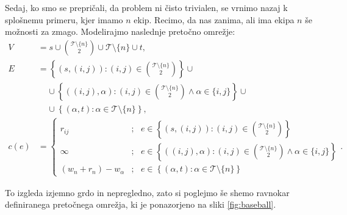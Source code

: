 \documentclass[mat1]{fmfdelo}
\begin{document}
Sedaj, ko smo se prepričali, da problem ni čisto trivialen, se vrnimo nazaj k splošnemu primeru, kjer imamo $n$ ekip. Recimo, da nas zanima, ali ima ekipa $n$ še možnosti za zmago. Modelirajmo naslednje pretočno omrežje:
\begin{align*}
V &= s \cup \binom{\mathcal{T} \setminus \{n\}}{2} \cup \mathcal{T} \setminus \{n\} \cup t,\\
E &= \left\{(s,(i,j)) : (i,j) \in \binom{\mathcal{T} \setminus \{n\}}{2}\right\} \cup\\
&~~~~~\cup \left\{((i,j), \alpha) : (i,j) \in \binom{\mathcal{T} \setminus \{n\}}{2} \wedge \alpha \in \{i,j\}\right\} \cup\\
&~~~~~\cup \left\{(\alpha, t) : \alpha \in \mathcal{T} \setminus \{n\}\right\},\\
c(e) &=\begin{cases}
r_{ij} &;~~~ e \in \left\{(s,(i,j)) : (i,j) \in \binom{\mathcal{T} \setminus \{n\}}{2}\right\}\\
\infty &;~~~ e \in \left\{((i,j), \alpha) : (i,j) \in \binom{\mathcal{T} \setminus \{n\}}{2} \wedge \alpha \in \{i,j\}\right\}\\
(w_n + r_n) - w_{\alpha} &;~~~ e \in \left\{(\alpha, t) : \alpha \in \mathcal{T} \setminus \{n\}\right\}
\end{cases}.
\end{align*}

To izgleda izjemno grdo in nepregledno, zato si poglejmo še shemo ravnokar definiranega pretočnega omrežja, ki je ponazorjeno na sliki \ref{fig:baseball}.
\end{document}
